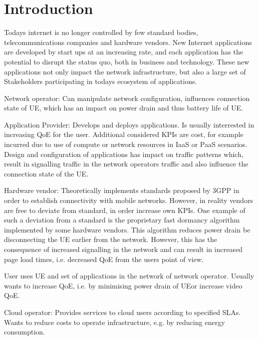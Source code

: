 \chapter{Introduction}\label{chap:introduction}

Todays internet is no longer controlled by few standard bodies, telecommunications companies and hardware vendors. 
New Internet applications are developed by start ups at an increasing rate, and each application has the potential to disrupt the status quo, both in business and technology.
These new applications not only impact the network infrastructure, but also a large set of Stakeholders participating in todays ecosystem of applications.

Network operator: Can manipulate network configuration, influences connection state of UE, which has an impact on power drain and thus battery life of UE.

Application Provider: Develops and deploys applications. Is usually interrested in increasing \gls{QoE} for the user. Additional considered \glspl{KPI} are cost, for example incurred due to use of compute or network resources in \gls{IaaS} or \gls{PaaS} scenarios. Design and configuration of applications has impact on traffic patterns which, result in signalling traffic in the network operators traffic and also influence the connection state of the UE.

Hardware vendor: Theoretically implements standards proposed by \gls{3GPP} in order to establish connectivity with mobile networks. However, in reality vendors are free to deviate from standard, in order increase own \glspl{KPI}. One example of such a deviation from a standard is the proprietary fast dormancy algorithm implemented by some hardware vendors. This algorithm reduces power drain be disconnecting the \gls{UE} earlier from the network. However, this has the consequence of increased signalling in the network and can result in increased page load times, i.e. decreased \gls{QoE} from the users point of view.

User uses \gls{UE} and set of applications in the network of network operator. 
Usually wants to increase \gls{QoE}, i.e. by minimising power drain of \gls{UE}or increase video \gls{QoE}.

Cloud operator: Provides services to cloud users according to specified \glspl{SLA}. Wants to reduce costs to operate infrastructure, e.g. by reducing energy consumption.

